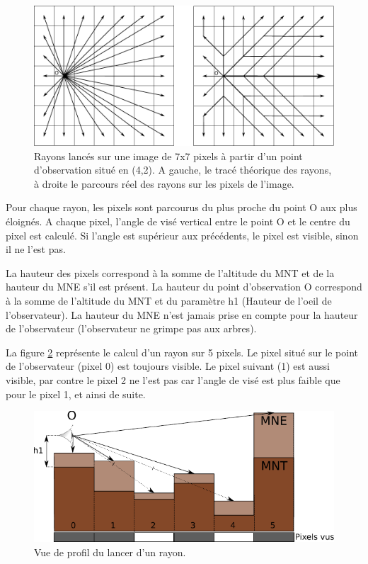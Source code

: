 \documentclass{report}
\begin{document}
\begin{figure}[H]
	\includegraphics[scale=0.8]{img/grid.pdf} 
	\caption{Rayons lancés sur une image de 7x7 pixels à partir d'un point d'observation situé en (4,2). A gauche, le tracé théorique des rayons, à droite le parcours réel des rayons sur les pixels de l'image.}
	\label{grid}
\end{figure}

Pour chaque rayon, les pixels sont parcourus du plus proche du point O aux plus éloignés. A chaque pixel, l'angle de visé vertical entre le point O et le centre du pixel est calculé. Si l'angle est supérieur aux précédents, le pixel est visible, sinon il ne l'est pas. 

La hauteur des pixels correspond à la somme de l'altitude du MNT et de la hauteur du MNE s'il est présent. La hauteur du point d'observation O correspond à la somme de l'altitude du MNT et du paramètre h1 (Hauteur de l'oeil de l'observateur). La hauteur du MNE n'est jamais prise en compte pour la hauteur de l'observateur (l'observateur ne grimpe pas aux arbres).

La figure \ref{ray_side} représente le calcul d'un rayon sur 5 pixels. Le pixel situé sur le point de l'observateur (pixel 0) est toujours visible. Le pixel suivant (1) est aussi visible, par contre le pixel 2 ne l'est pas car l'angle de visé est plus faible que pour le pixel 1, et ainsi de suite.

\begin{figure}[H]
	\includegraphics{img/ray_side-fr.pdf} 
	\caption{Vue de profil du lancer d'un rayon.}
	\label{ray_side}
\end{figure}
\end{document}
